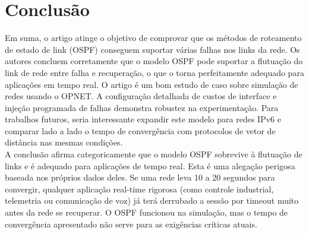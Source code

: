 \documentclass[conference]{IEEEtran}
\begin{document}
\section{Conclusão}
Em suma, o artigo atinge o objetivo de comprovar que os métodos de roteamento de estado de link (OSPF) conseguem suportar várias falhas nos links da rede. Os autores concluem corretamente que o modelo OSPF pode suportar a flutuação do link de rede entre falha e recuperação, o que o torna perfeitamente adequado para aplicações em tempo real. O artigo é um bom estudo de caso sobre simulação de redes usando o OPNET. A configuração detalhada de custos de interface e injeção programada de falhas demonstra robustez na experimentação. Para trabalhos futuros, seria interessante expandir este modelo para redes IPv6 e comparar lado a lado o tempo de convergência com protocolos de vetor de distância nas mesmas condições.\\
A conclusão afirma categoricamente que o modelo OSPF sobrevive à flutuação de links e é adequado para aplicações de tempo real. Esta é uma alegação perigosa baseada nos próprios dados deles. Se uma rede leva 10 a 20 segundos para convergir, qualquer aplicação real-time rigorosa (como controle industrial, telemetria ou comunicação de voz) já terá derrubado a sessão por timeout muito antes da rede se recuperar. O OSPF funcionou na simulação, mas o tempo de convergência apresentado não serve para as exigências críticas atuais.
\end{document}
